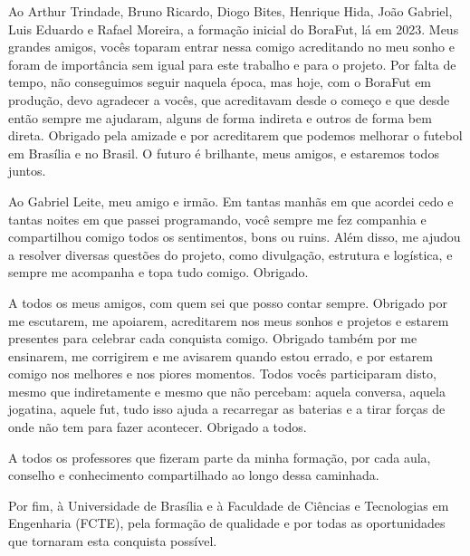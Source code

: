 \begin{agradecimentos}
Ao Arthur Trindade, Bruno Ricardo, Diogo Bites, Henrique Hida, João Gabriel, Luis Eduardo e Rafael Moreira, a formação inicial do BoraFut, lá em 2023. Meus grandes amigos, vocês toparam entrar nessa comigo acreditando no meu sonho e foram de importância sem igual para este trabalho e para o projeto. Por falta de tempo, não conseguimos seguir naquela época, mas hoje, com o BoraFut em produção, devo agradecer a vocês, que acreditavam desde o começo e que desde então sempre me ajudaram, alguns de forma indireta e outros de forma bem direta. Obrigado pela amizade e por acreditarem que podemos melhorar o futebol em Brasília e no Brasil. O futuro é brilhante, meus amigos, e estaremos todos juntos.

Ao Gabriel Leite, meu amigo e irmão. Em tantas manhãs em que acordei cedo e tantas noites em que passei programando, você sempre me fez companhia e compartilhou comigo todos os sentimentos, bons ou ruins. Além disso, me ajudou a resolver diversas questões do projeto, como divulgação, estrutura e logística, e sempre me acompanha e topa tudo comigo. Obrigado.

A todos os meus amigos, com quem sei que posso contar sempre. Obrigado por me escutarem, me apoiarem, acreditarem nos meus sonhos e projetos e estarem presentes para celebrar cada conquista comigo. Obrigado também por me ensinarem, me corrigirem e me avisarem quando estou errado, e por estarem comigo nos melhores e nos piores momentos. Todos vocês participaram disto, mesmo que indiretamente e mesmo que não percebam: aquela conversa, aquela jogatina, aquele fut, tudo isso ajuda a recarregar as baterias e a tirar forças de onde não tem para fazer acontecer. Obrigado a todos.

A todos os professores que fizeram parte da minha formação, por cada aula, conselho e conhecimento compartilhado ao longo dessa caminhada.

Por fim, à Universidade de Brasília e à Faculdade de Ciências e Tecnologias em Engenharia (FCTE), pela formação de qualidade e por todas as oportunidades que tornaram esta conquista possível.

\end{agradecimentos}
